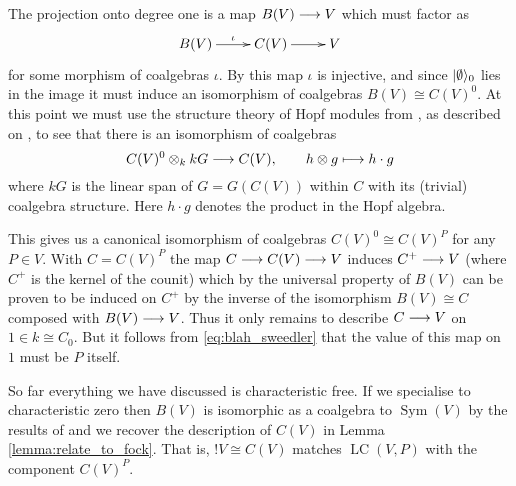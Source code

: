 \documentclass[english,letter paper,12pt,reqno]{article}
\DeclarePairedDelimiter\ket{\lvert}{\rangle}
\theoremstyle{example}
\numberwithin{equation}{section}
\def\vacu{\ket{\emptyset}}
\DeclareMathOperator{\Sym}{Sym}
\DeclareMathOperator{\LC}{LC}
\begin{document}
The projection onto degree one is a map $B(V) \longrightarrow V$ which must factor as
\[
\xymatrix{
B(V) \ar[r]^-{\iota} & C(V) \ar[r] & V
}
\]
for some morphism of coalgebras $\iota$. By \cite[Theorem 12.2.6]{sweedler} this map $\iota$ is injective, and since $\vacu_0$ lies in the image it must induce an isomorphism of coalgebras $B(V) \cong C(V)^0$. At this point we must use the structure theory of Hopf modules from \cite[Chapter 4]{sweedler}, as described on \cite[p.175]{sweedler}, to see that there is an isomorphism of coalgebras
\[
C(V)^0 \otimes_k kG \longrightarrow C(V), \qquad h \otimes g \longmapsto h \cdot g
\]
where $kG$ is the linear span of $G = G(C(V))$ within $C$ with its (trivial) coalgebra structure. Here $h \cdot g$ denotes the product in the Hopf algebra. 

This gives us a canonical isomorphism of coalgebras $C(V)^0 \cong C(V)^P$ for any $P \in V$. With $C = C(V)^P$ the map $C \longrightarrow C(V) \longrightarrow V$ induces $C^+ \longrightarrow V$ (where $C^+$ is the kernel of the counit) which by the universal property of $B(V)$ \cite[Theorem 12.2.5]{sweedler} can be proven to be induced on $C^+$ by the inverse of the isomorphism $B(V) \cong C$ composed with $B(V) \longrightarrow V$. Thus it only remains to describe $C \longrightarrow V$ on $1 \in k \cong C_0$. But it follows from \eqref{eq:blah_sweedler} that the value of this map on $1$ must be $P$ itself.

So far everything we have discussed is characteristic free. If we specialise to characteristic zero then $B(V)$ is isomorphic as a coalgebra to $\Sym(V)$ by the results of \cite[Chapter 12]{sweedler} and we recover the description of $C(V)$ in Lemma \ref{lemma:relate_to_fock}. That is, ${!} V \cong C(V)$ matches $\LC(V,P)$ with the component $C(V)^P$. %
\end{document}
